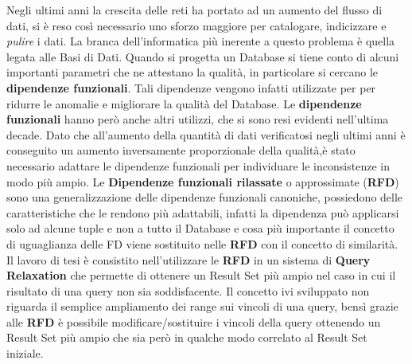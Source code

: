 Negli ultimi anni la crescita delle reti ha portato ad un aumento del flusso di dati, si è reso così necessario uno sforzo maggiore per catalogare, indicizzare e \textit{pulire} i  dati. 
La branca dell’informatica più inerente a questo problema è quella legata alle Basi di Dati. 
Quando si progetta un Database si tiene conto di alcuni importanti parametri che ne attestano la qualità, in particolare si cercano le \textbf{dipendenze funzionali}. Tali dipendenze vengono infatti utilizzate per per ridurre le anomalie e migliorare la qualità del Database.
Le \textbf{dipendenze funzionali} hanno però anche altri utilizzi, che si sono resi evidenti nell’ultima decade. Dato che all’aumento della quantità di dati verificatosi negli ultimi anni è conseguito un aumento inversamente proporzionale della qualità,è stato necessario  adattare le dipendenze funzionali per individuare le inconsistenze in modo più ampio.
Le \textbf{Dipendenze funzionali rilassate} o approssimate (\textbf{RFD}) sono una generalizzazione delle dipendenze funzionali canoniche, possiedono delle caratteristiche che le rendono più adattabili, infatti la dipendenza può applicarsi solo ad alcune tuple e non a tutto il Database e cosa più importante il concetto di uguaglianza delle FD viene sostituito nelle \textbf{RFD}  con il concetto di similarità. 
Il lavoro di tesi è consistito nell’utilizzare le \textbf{RFD} in un sistema di \textbf{Query Relaxation} che permette di ottenere un Result Set più ampio nel caso in cui il risultato di una query non sia soddisfacente.
Il concetto ivi sviluppato non riguarda il semplice ampliamento dei range sui vincoli di una query, bensì grazie alle \textbf{RFD}  è possibile modificare/sostituire i vincoli della query ottenendo un Result Set più ampio che sia però in qualche modo correlato al Result Set iniziale.